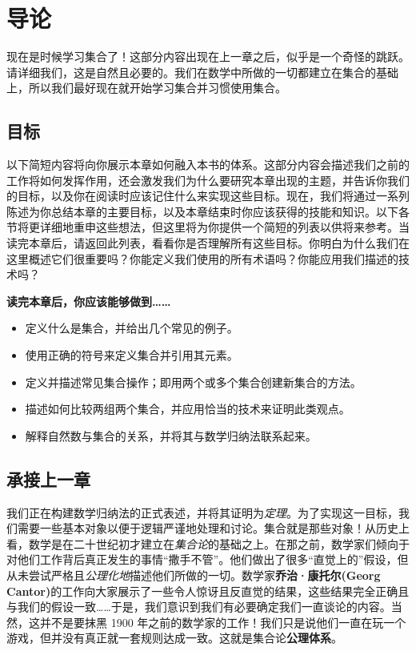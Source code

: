 \section{导论}

现在是时候学习集合了！这部分内容出现在上一章之后，似乎是一个奇怪的跳跃。请详细我们，这是自然且必要的。我们在数学中所做的一切都建立在集合的基础上，所以我们最好现在就开始学习集合并习惯使用集合。

\subsection{目标}

以下简短内容将向你展示本章如何融入本书的体系。这部分内容会描述我们之前的工作将如何发挥作用，还会激发我们为什么要研究本章出现的主题，并告诉你我们的目标，以及你在阅读时应该记住什么来实现这些目标。现在，我们将通过一系列陈述为你总结本章的主要目标，以及本章结束时你应该获得的技能和知识。以下各节将更详细地重申这些想法，但这里将为你提供一个简短的列表以供将来参考。当读完本章后，请返回此列表，看看你是否理解所有这些目标。你明白为什么我们在这里概述它们很重要吗？你能定义我们使用的所有术语吗？你能应用我们描述的技术吗？

\textbf{读完本章后，你应该能够做到……}

\begin{itemize}
    \item 定义什么是集合，并给出几个常见的例子。
    \item 使用正确的符号来定义集合并引用其元素。
    \item 定义并描述常见集合操作；即用两个或多个集合创建新集合的方法。
    \item 描述如何比较两组两个集合，并应用恰当的技术来证明此类观点。
    \item 解释自然数与集合的关系，并将其与数学归纳法联系起来。
\end{itemize}

\subsection{承接上一章}

我们正在构建数学归纳法的正式表述，并将其证明为\textit{定理}。为了实现这一目标，我们需要一些基本对象以便于逻辑严谨地处理和讨论。集合就是那些对象！从历史上看，数学是在二十世纪初才建立在\textit{集合论}的基础之上。在那之前，数学家们倾向于对他们工作背后真正发生的事情“撒手不管”。他们做出了很多“直觉上的”假设，但从未尝试严格且\textit{公理化地}描述他们所做的一切。数学家\textbf{乔治·康托尔(Georg Cantor)}的工作向大家展示了一些令人惊讶且反直觉的结果，这些结果完全正确且与我们的假设一致……于是，我们意识到我们有必要确定我们一直谈论的内容。当然，这并不是要抹黑 1900 年之前的数学家的工作！我们只是说他们一直在玩一个游戏，但并没有真正就一套规则达成一致。这就是集合论\textbf{公理体系}。

